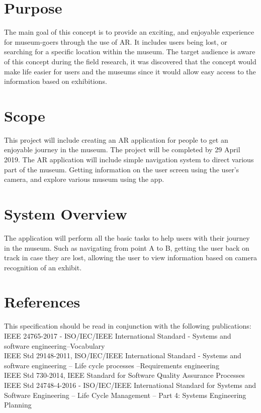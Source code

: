 
\section{Purpose}
The main goal of this concept is to provide an exciting, and enjoyable experience for museum-goers through the use of AR. It includes users being lost, or searching for a specific location within the museum. The target audience is aware of this concept during the field research, it was discovered that the concept would make life easier for users and the museums since it would allow easy access to the information based on exhibitions.

\section{Scope}
This project will include creating an AR application for people to get an enjoyable journey in the museum. The project will be completed by 29 April 2019. The AR application will include simple navigation system to direct various part of the museum. Getting information on the user screen using the user's camera, and explore various museum using the app. 

\section{System Overview}
The application will perform all the basic tasks to help users with their journey in the museum. Such as navigating from point A to B, getting the user back on track in case they are lost, allowing the user to view information based on camera recognition of an exhibit.

\section{References}
This specification should be read in conjunction with the following publications:\\
IEEE 24765-2017 - ISO/IEC/IEEE International Standard - Systems and software engineering--Vocabulary \cite{IEEE24765}\\
IEEE Std 29148-2011, ISO/IEC/IEEE International Standard - Systems and software engineering -- Life cycle processes --Requirements engineering \cite{IEEE29148} \\
IEEE Std 730-2014, IEEE Standard for Software Quality Assurance Processes \cite{IEEE730} \\
IEEE Std 24748-4-2016 - ISO/IEC/IEEE International Standard for Systems and Software Engineering -- Life Cycle Management -- Part 4: Systems Engineering Planning \cite{IEEE24748}

